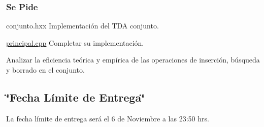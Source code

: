 \hypertarget{index_ssPide}{}\subsubsection{Se Pide}\label{index_ssPide}
\begin{DoxyItemize}
\item conjunto.\+hxx Implementación del T\+DA conjunto. \item \hyperlink{principal_8cpp}{principal.\+cpp} Completar su implementación. \item Analizar la eficiencia teórica y empírica de las operaciones de inserción, búsqueda y borrado en el conjunto.\end{DoxyItemize}
\hypertarget{index_fecha}{}\subsection{\char`\"{}\+Fecha Límite de Entrega\char`\"{}}\label{index_fecha}
La fecha límite de entrega será el 6 de Noviembre a las 23\+:50 hrs. 